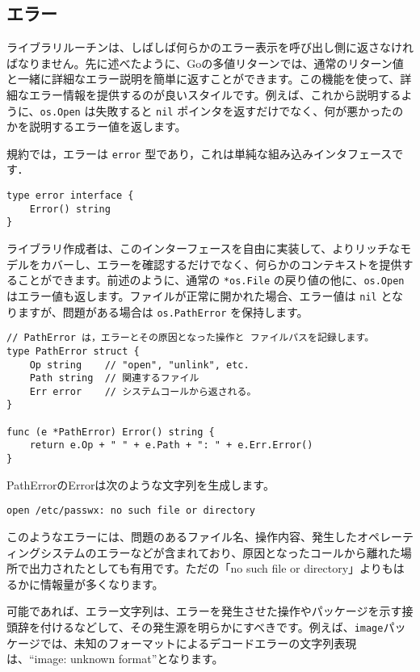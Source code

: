 \documentclass{jsarticle}
\begin{document}
\subsection{エラー}

ライブラリルーチンは、しばしば何らかのエラー表示を呼び出し側に返さなければなりません。先に述べたように、Goの多値リターンでは、通常のリターン値と一緒に詳細なエラー説明を簡単に返すことができます。この機能を使って、詳細なエラー情報を提供するのが良いスタイルです。例えば、これから説明するように、\texttt{os.Open}
は失敗すると \texttt{nil}
ポインタを返すだけでなく、何が悪かったのかを説明するエラー値を返します。

規約では，エラーは \texttt{error}
型であり，これは単純な組み込みインタフェースです．

\begin{lstlisting}[numbers=none]
type error interface {
    Error() string
}
\end{lstlisting}

ライブラリ作成者は、このインターフェースを自由に実装して、よりリッチなモデルをカバーし、エラーを確認するだけでなく、何らかのコンテキストを提供することができます。前述のように、通常の
\texttt{*os.File} の戻り値の他に、\texttt{os.Open}
はエラー値も返します。ファイルが正常に開かれた場合、エラー値は
\texttt{nil} となりますが、問題がある場合は \texttt{os.PathError}
を保持します。

\begin{lstlisting}[numbers=none]
// PathError は，エラーとその原因となった操作と ファイルパスを記録します。
type PathError struct {
    Op string    // "open", "unlink", etc.
    Path string  // 関連するファイル
    Err error    // システムコールから返される。
}

func (e *PathError) Error() string {
    return e.Op + " " + e.Path + ": " + e.Err.Error()
}
\end{lstlisting}

PathErrorのErrorは次のような文字列を生成します。

\begin{lstlisting}[numbers=none]
open /etc/passwx: no such file or directory
\end{lstlisting}

このようなエラーには、問題のあるファイル名、操作内容、発生したオペレーティングシステムのエラーなどが含まれており、原因となったコールから離れた場所で出力されたとしても有用です。ただの「no
such file or directory」よりもはるかに情報量が多くなります。

可能であれば、エラー文字列は、エラーを発生させた操作やパッケージを示す接頭辞を付けるなどして、その発生源を明らかにすべきです。例えば、\texttt{image}パッケージでは、未知のフォーマットによるデコードエラーの文字列表現は、``image:
unknown format''となります。
\end{document}
